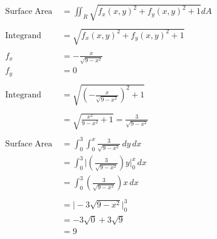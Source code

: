 \documentclass[a4paper,11pt]{article}
\begin{document}
\begin{preview}
\begin{enumerate}
\begin{enumerate}
        \begin{align*}
            \mathrm{Surface \; Area \;} &= \iint_R \sqrt{ f_x(x,y)^2 + f_y(x,y)^2 +1} dA\\\\
            \mathrm{Integrand} &= \sqrt{ f_x(x,y)^2 + f_y(x,y)^2 +1}\\\\
            f_x &= -\frac{x}{\sqrt{9 - x^2}}\\
            f_y &= 0 \\\\
            \mathrm{Integrand} &= \sqrt{ \left(-\frac{x}{\sqrt{9 - x^2}}\right)^2 +1}\\\\
            &= \sqrt{ \frac{x^2}{9-x^2} +1} = \frac{3}{\sqrt{9-x^2}}\\\\
            \mathrm{Surface \; Area \;} &= \int_{0}^{3} \int_{0}^{x} \frac{3}{\sqrt{9-x^2}} \,dy  \,dx \\ 
            &= \int_{0}^{3} \Big| \left( \frac{3}{\sqrt{9-x^2}} \right) y \Big|_{0}^{x}  \,dx \\
            &= \int_{0}^{3} \left( \frac{3}{\sqrt{9-x^2}} \right) x  \,dx \\\\
            &= \Big| -3\sqrt{9-x^2} \Big|_{0}^{3}\\
            &= -3\sqrt{0} + 3\sqrt{9}\\
            &= 9
        \end{align*}

    \end{enumerate}

\end{enumerate}
\end{preview}
\end{document}
